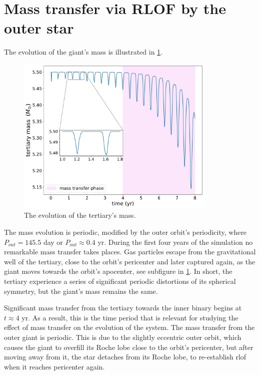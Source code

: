 \section{Mass transfer via RLOF by the outer star}\label{sec:mass_transfer_RLOF}

The evolution of the giant's mass is illustrated in \cref{fig:accretion_inc_00_mass_loss}.
\begin{figure}[!htb]
    \centering
    \includegraphics[width=0.85\textwidth]{Thesis/graphs/inc_00/accretion_inc_00_mass_loss.pdf}
    \caption{The evolution of the tertiary's mass.}
    \label{fig:accretion_inc_00_mass_loss}
\end{figure}
The mass evolution is periodic, modified by the outer orbit's periodicity, where $P_{out} = 145.5$ day or $P_{out} \approx 0.4$ yr. During the first four years of the simulation no remarkable mass transfer takes places. Gas particles escape from the gravitational well of the tertiary, close to the orbit's pericenter and later captured again, as the giant moves towards the orbit's apocenter, see subfigure in \cref{fig:accretion_inc_00_mass_loss}. In short, the tertiary experience a series of significant periodic distortions of its spherical symmetry, but the giant's mass remains the same.

Significant mass transfer from the tertiary towards the inner binary begins at $t \approx 4$ yr. As a result, this is the time period that is relevant for studying the effect of mass transfer on the evolution of the system. The mass transfer from the outer giant is periodic. This is due to the slightly eccentric outer orbit, which causes the giant to overfill its Roche lobe close to the orbit's pericenter, but after moving away from it, the star detaches from its Roche lobe, to re-establish \ac{rlof} when it reaches pericenter again. 

